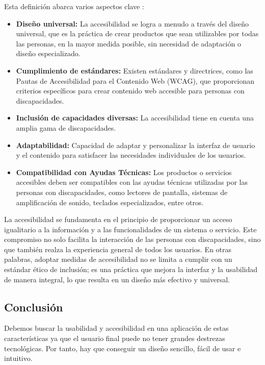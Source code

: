 Esta definición abarca varios aspectos clave \cite{principios_accesibilidad}: 

\begin{itemize}
	\item \textbf{Diseño universal: } La accesibilidad se logra a menudo a través del diseño universal, que es la práctica de crear productos que sean utilizables por todas las personas, en la mayor medida posible, sin necesidad de adaptación o diseño especializado.
	\item \textbf{Cumplimiento de estándares: } Existen estándares y directrices, como las Pautas de Accesibilidad para el Contenido Web (WCAG), que proporcionan criterios específicos para crear contenido web accesible para personas con discapacidades.
	\item \textbf{Inclusión de capacidades diversas: } La accesibilidad tiene en cuenta una amplia gama de discapacidades.
	\item \textbf{Adaptabilidad: } Capacidad de adaptar y personalizar la interfaz de usuario y el contenido para satisfacer las necesidades individuales de los usuarios.
	\item \textbf{Compatibilidad con Ayudas Técnicas: } Los productos o servicios accesibles deben ser compatibles con las ayudas técnicas utilizadas por las personas con discapacidades, como lectores de pantalla, sistemas de amplificación de sonido, teclados especializados, entre otros.
\end{itemize}

La accesibilidad se fundamenta en el principio de proporcionar un acceso igualitario a la información y a las funcionalidades de un sistema o servicio. Este compromiso no solo facilita la interacción de las personas con discapacidades, sino que también realza la experiencia general de todos los usuarios. En otras palabras, adoptar medidas de accesibilidad no se limita a cumplir con un estándar ético de inclusión; es una práctica que mejora la interfaz y la usabilidad de manera integral, lo que resulta en un diseño más efectivo y universal. \cite{fernandez2021accesibilidad}

\subsection{Conclusión}

Debemos buscar la usabilidad y accesibilidad en una aplicación de estas características ya que el usuario final puede no tener grandes destrezas tecnológicas. Por tanto, hay que conseguir un diseño sencillo, fácil de usar e intuitivo. \\

